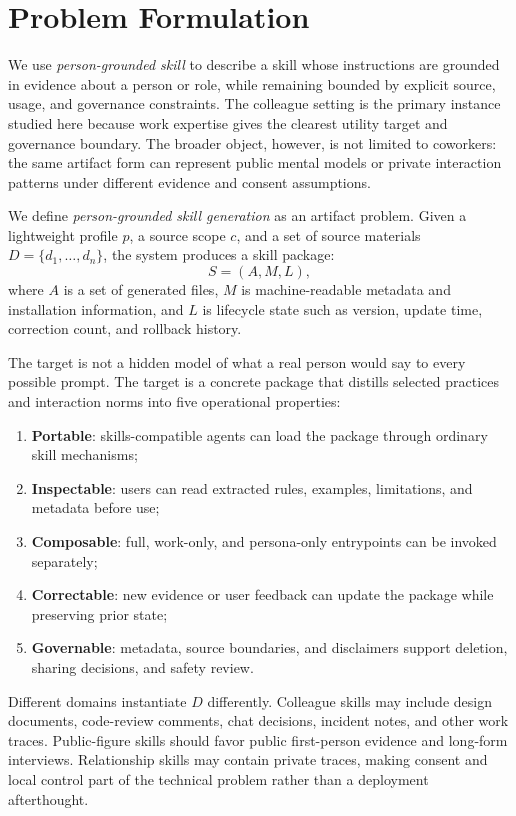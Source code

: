 \documentclass{llmxive}
\begin{document}
\section{Problem Formulation}

We use \emph{person-grounded skill} to describe a skill whose instructions are grounded in evidence about a person or role, while remaining bounded by explicit source, usage, and governance constraints. The colleague setting is the primary instance studied here because work expertise gives the clearest utility target and governance boundary. The broader object, however, is not limited to coworkers: the same artifact form can represent public mental models or private interaction patterns under different evidence and consent assumptions.

We define \emph{person-grounded skill generation} as an artifact problem. Given a lightweight profile $p$, a source scope $c$, and a set of source materials $D=\{d_1,\ldots,d_n\}$, the system produces a skill package:
\[
S = (A, M, L),
\]
where $A$ is a set of generated files, $M$ is machine-readable metadata and installation information, and $L$ is lifecycle state such as version, update time, correction count, and rollback history.

The target is not a hidden model of what a real person would say to every possible prompt. The target is a concrete package that distills selected practices and interaction norms into five operational properties:
\begin{enumerate}
  \item \textbf{Portable}: skills-compatible agents can load the package through ordinary skill mechanisms;
  \item \textbf{Inspectable}: users can read extracted rules, examples, limitations, and metadata before use;
  \item \textbf{Composable}: full, work-only, and persona-only entrypoints can be invoked separately;
  \item \textbf{Correctable}: new evidence or user feedback can update the package while preserving prior state;
  \item \textbf{Governable}: metadata, source boundaries, and disclaimers support deletion, sharing decisions, and safety review.
\end{enumerate}

Different domains instantiate $D$ differently. Colleague skills may include design documents, code-review comments, chat decisions, incident notes, and other work traces. Public-figure skills should favor public first-person evidence and long-form interviews. Relationship skills may contain private traces, making consent and local control part of the technical problem rather than a deployment afterthought.
\end{document}
